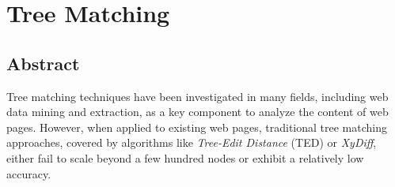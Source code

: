 \chapter{Tree Matching}\label{chap:sftm}
\section{Abstract}
Tree matching techniques have been investigated in many fields, including web data mining and extraction, as a key component to analyze the content of web pages.
However, when applied to existing web pages, traditional tree matching approaches, covered by algorithms like \emph{Tree-Edit Distance} (TED) or \emph{XyDiff}, either fail to scale beyond a few hundred nodes or exhibit a relatively low accuracy.

